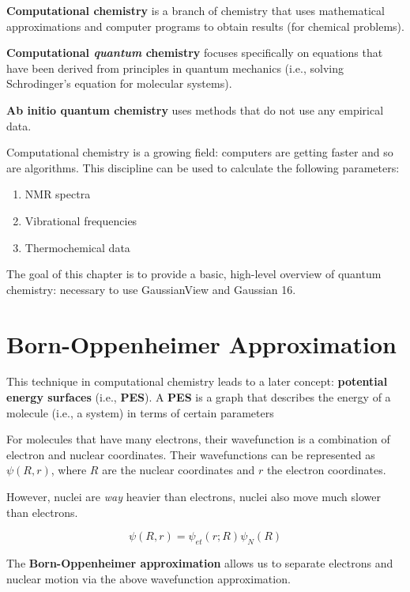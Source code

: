 \documentclass[
  letterpaper,
  DIV=11,
  numbers=noendperiod]{scrreprt}
\providecommand{\tightlist}{%
  \setlength{\itemsep}{0pt}\setlength{\parskip}{0pt}}\usepackage{longtable,booktabs,array}
\begin{document}
\textbf{Computational chemistry} is a branch of chemistry that uses
mathematical approximations and computer programs to obtain results (for
chemical problems).

\textbf{Computational \emph{quantum} chemistry} focuses specifically on
equations that have been derived from principles in quantum mechanics
(i.e., solving Schrodinger's equation for molecular systems).

\textbf{Ab initio quantum chemistry} uses methods that do not use any
empirical data.

Computational chemistry is a growing field: computers are getting faster
and so are algorithms. This discipline can be used to calculate the
following parameters:

\begin{enumerate}
\def\labelenumi{\arabic{enumi}.}
\tightlist
\item
  NMR spectra
\item
  Vibrational frequencies
\item
  Thermochemical data
\end{enumerate}

The goal of this chapter is to provide a basic, high-level overview of
quantum chemistry: necessary to use GaussianView and Gaussian 16.

\hypertarget{born-oppenheimer-approximation}{%
\section{Born-Oppenheimer
Approximation}\label{born-oppenheimer-approximation}}

This technique in computational chemistry leads to a later concept:
\textbf{potential energy surfaces} (i.e., \textbf{PES}). A \textbf{PES}
is a graph that describes the energy of a molecule (i.e., a system) in
terms of certain parameters

For molecules that have many electrons, their wavefunction is a
combination of electron and nuclear coordinates. Their wavefunctions can
be represented as \(\psi(R, r)\), where \(R\) are the nuclear
coordinates and \(r\) the electron coordinates.

However, nuclei are \emph{way} heavier than electrons, nuclei also move
much slower than electrons.

\begin{equation}
  \psi(R, r) = \psi_{et}(r; R)\psi_N(R)
\end{equation}

The \textbf{Born-Oppenheimer approximation} allows us to separate
electrons and nuclear motion via the above wavefunction approximation.
\end{document}
